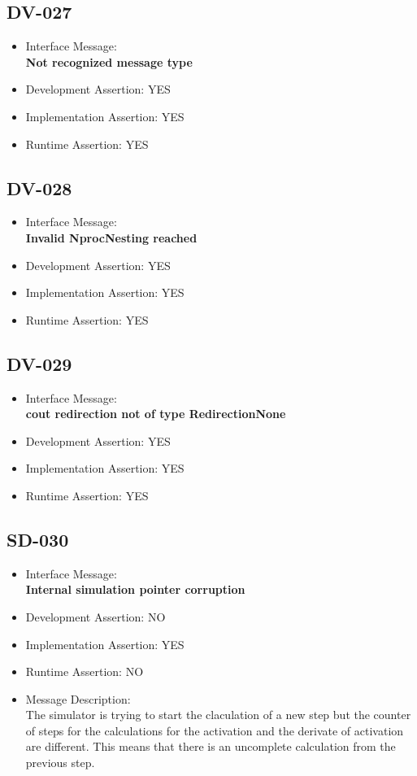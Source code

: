 \subsection{DV-027}
\begin{itemize}
  \item Interface Message:\\[1em]
    \textbf{Not recognized message type}
  \item Development Assertion: YES
  \item Implementation Assertion: YES
  \item Runtime Assertion: YES
\end{itemize}

\subsection{DV-028}
\begin{itemize}
  \item Interface Message:\\[1em]
    \textbf{Invalid NprocNesting reached}
  \item Development Assertion: YES
  \item Implementation Assertion: YES
  \item Runtime Assertion: YES
\end{itemize}

\subsection{DV-029}
\begin{itemize}
  \item Interface Message:\\[1em]
    \textbf{cout redirection not of type RedirectionNone}
  \item Development Assertion: YES
  \item Implementation Assertion: YES
  \item Runtime Assertion: YES
\end{itemize}

\subsection{SD-030}
\begin{itemize}
  \item Interface Message:\\[1em]
    \textbf{Internal simulation pointer corruption}
  \item Development Assertion: NO
  \item Implementation Assertion: YES
  \item Runtime Assertion: NO
  \item Message Description:\\[1em]
    The simulator is trying to start the claculation of a new step but the counter of steps for the calculations for the activation and the derivate of activation are different. This means that there is an uncomplete calculation from the previous step.
\end{itemize}

